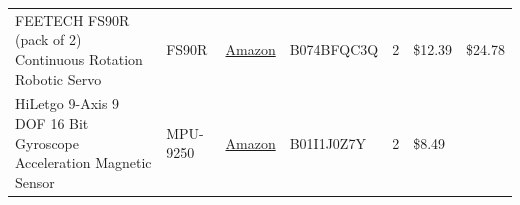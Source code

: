 \documentclass[]{article}
\begin{document}
\begin{longtable}[]{@{}lllllll@{}}
\begin{minipage}[t]{0.15\columnwidth}\raggedright
FEETECH FS90R (pack of 2) Continuous Rotation Robotic Servo\strut
\end{minipage} & \begin{minipage}[t]{0.15\columnwidth}\raggedright
FS90R\strut
\end{minipage} & \begin{minipage}[t]{0.10\columnwidth}\raggedright
\href{https://www.amazon.com/gp/product/B074BFQC3Q/ref=oh_aui_detailpage_o06_s00?ie=UTF8\&psc=1}{Amazon}\strut
\end{minipage} & \begin{minipage}[t]{0.17\columnwidth}\raggedright
B074BFQC3Q\strut
\end{minipage} & \begin{minipage}[t]{0.11\columnwidth}\raggedright
2\strut
\end{minipage} & \begin{minipage}[t]{0.06\columnwidth}\raggedright
\$12.39\strut
\end{minipage} & \begin{minipage}[t]{0.07\columnwidth}\raggedright
\$24.78\strut
\end{minipage}\tabularnewline
\begin{minipage}[t]{0.15\columnwidth}\raggedright
HiLetgo 9-Axis 9 DOF 16 Bit Gyroscope Acceleration Magnetic Sensor\strut
\end{minipage} & \begin{minipage}[t]{0.15\columnwidth}\raggedright
MPU-9250\strut
\end{minipage} & \begin{minipage}[t]{0.10\columnwidth}\raggedright
\href{https://www.amazon.com/HiLetgo-Gyroscope-Acceleration-Accelerator-Magnetometer/dp/B01I1J0Z7Y/ref=redir_mobile_desktop?_encoding=UTF8\&dpID=51nl2fcMh6L\&dpPl=1\&keywords=mpu\%209250\&pi=AC_SX236_SY340_QL65\&qid=1512564044\&ref=plSrch\&ref_=mp_s_a_1_3\&sr=8-3}{Amazon}\strut
\end{minipage} & \begin{minipage}[t]{0.17\columnwidth}\raggedright
B01I1J0Z7Y\strut
\end{minipage} & \begin{minipage}[t]{0.11\columnwidth}\raggedright
2\strut
\end{minipage} & \begin{minipage}[t]{0.06\columnwidth}\raggedright
\$8.49\strut
\end{minipage} & \begin{minipage}[t]{0.07\columnwidth}\raggedright

\end{minipage}
\end{longtable}
\end{document}
